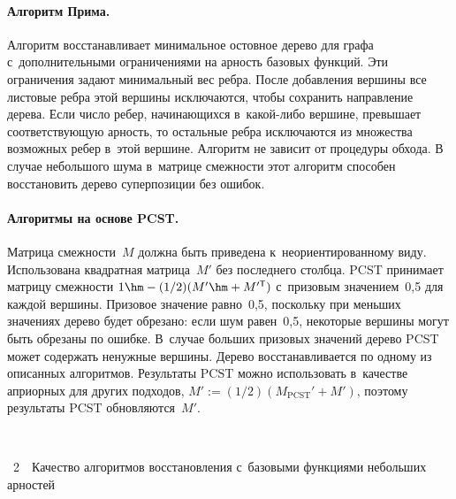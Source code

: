 \begin{multicols}{2}
\vspace*{-12pt}

\paragraph*{Алгоритм Прима.}
Алгоритм восстанавливает минимальное остовное дерево для графа с~дополнительными 
ограничениями на арность базовых функций. Эти ограничения задают минимальный вес 
ребра. После добавления вершины все листовые ребра этой вершины исключаются, 
чтобы сохранить направление дерева. Если число ребер, начинающихся в~какой-либо 
вершине, превышает соответствующую арность, то остальные ребра исключаются из 
множества возможных ребер в~этой вершине. Алгоритм не зависит от процедуры 
обхода. В случае небольшого шума в~матрице смежности этот алгоритм способен 
восстановить дерево суперпозиции без ошибок. 


\vspace*{-12pt}

\paragraph*{Алгоритмы на основе PCST.}
Матрица смежности~$M$ должна быть приведена к~неориентированному виду. 
Использована квадратная матрица~$M'$ без последнего столбца. PCST 
принимает мат\-ри\-цу смеж\-ности $1 \hm- ({1}/{2})(M' \hm+ M'^{\mathsf{T}})$ с~призовым 
значением~0,5 для каждой вершины.
Призовое значение равно~0,5, поскольку при меньших значениях дерево будет 
обрезано: если шум равен~0,5, некоторые вершины могут быть обрезаны по ошибке. 
В~случае больших призовых значений дерево PCST может содержать ненужные 
вершины. Дерево восстанавливается по одному из описанных алгоритмов. Результаты 
$\text{PCST}$ можно использовать в~качестве априорных для других подходов, $M':=({1}/{2})(M_{\mathrm{PCST}}' + M')$,
поэтому результаты PCST обновляются~$M'$.

{ \begin{center}  %
 \vspace*{6pt}
    \mbox{%
\epsfxsize=79mm
}
\end{center}



\noindent
{{\figurename~2}\ \ \small{Качество алгоритмов восстановления с~базовыми функциями небольших 
арностей
}}}


\addtocounter{figure}{1}


\end{multicols}
